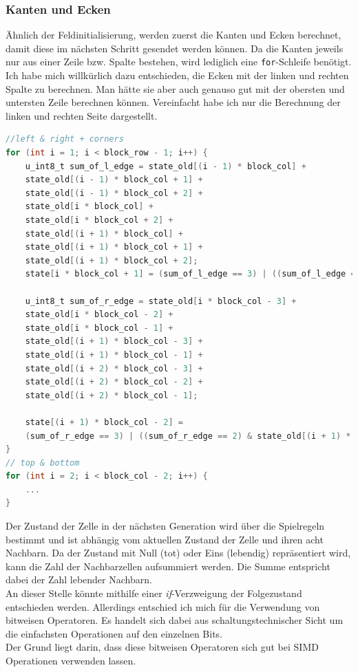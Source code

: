 \documentclass[german,plainarticle,hyperref,utf8]{zihpub}
\begin{document}
	\subsubsection{Kanten und Ecken} \label{Kanten}
	Ähnlich der Feldinitialisierung, werden zuerst die Kanten und Ecken berechnet, damit diese im nächsten Schritt gesendet werden können. Da die Kanten jeweils nur aus einer Zeile bzw. Spalte bestehen, wird lediglich eine \texttt{for}-Schleife benötigt.\\
	Ich habe mich willkürlich dazu entschieden, die Ecken mit der linken und rechten Spalte zu berechnen. Man hätte sie aber auch genauso gut mit der obersten und untersten Zeile berechnen können. Vereinfacht habe ich nur die Berechnung der linken und rechten Seite dargestellt.
	\begin{lstlisting}[language=C, caption=Berechnung der Kanten und Ecken]
//left & right + corners
for (int i = 1; i < block_row - 1; i++) {
	u_int8_t sum_of_l_edge = state_old[(i - 1) * block_col] +
	state_old[(i - 1) * block_col + 1] +
	state_old[(i - 1) * block_col + 2] +
	state_old[i * block_col] +
	state_old[i * block_col + 2] +
	state_old[(i + 1) * block_col] +
	state_old[(i + 1) * block_col + 1] +
	state_old[(i + 1) * block_col + 2];
	state[i * block_col + 1] = (sum_of_l_edge == 3) | ((sum_of_l_edge == 2) & state_old[i * block_col + 1]);
	
	u_int8_t sum_of_r_edge = state_old[i * block_col - 3] +
	state_old[i * block_col - 2] +
	state_old[i * block_col - 1] +
	state_old[(i + 1) * block_col - 3] +
	state_old[(i + 1) * block_col - 1] +
	state_old[(i + 2) * block_col - 3] +
	state_old[(i + 2) * block_col - 2] +
	state_old[(i + 2) * block_col - 1];
	
	state[(i + 1) * block_col - 2] =
	(sum_of_r_edge == 3) | ((sum_of_r_edge == 2) & state_old[(i + 1) * block_col - 2]);
}
// top & bottom
for (int i = 2; i < block_col - 2; i++) {
	...
}\end{lstlisting}
	Der Zustand der Zelle in der nächsten Generation wird über die Spielregeln bestimmt und ist abhängig vom aktuellen Zustand der Zelle und ihren acht Nachbarn. Da der Zustand mit Null (tot) oder Eins (lebendig) repräsentiert wird, kann die Zahl der Nachbarzellen aufsummiert werden. Die Summe entspricht dabei der Zahl lebender Nachbarn.\\
	An dieser Stelle könnte mithilfe einer \textit{if}-Verzweigung der Folgezustand entschieden werden. Allerdings entschied ich mich für die Verwendung von bitweisen Operatoren. Es handelt sich dabei aus schaltungstechnischer Sicht um die einfachsten Operationen auf den einzelnen Bits.\\
	Der Grund liegt darin, dass diese bitweisen Operatoren sich gut bei SIMD Operationen verwenden lassen.\\
	\clearpage
\end{document}
